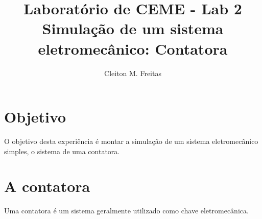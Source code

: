 \documentclass[a4paper]{article}
\title{Laboratório de CEME - Lab 2\\Simulação de um sistema eletromecânico: Contatora}
\author{Cleiton M. Freitas\\
}
\date{}
\theoremstyle{definition}
\theoremstyle{plain}
\begin{document}
\maketitle


\section{Objetivo}

O objetivo desta experiência é montar a simulação de um sistema eletromecânico simples, o sistema de uma contatora. 

\section{A contatora}


Uma contatora é um sistema geralmente utilizado como chave eletromecânica.
\end{document}
